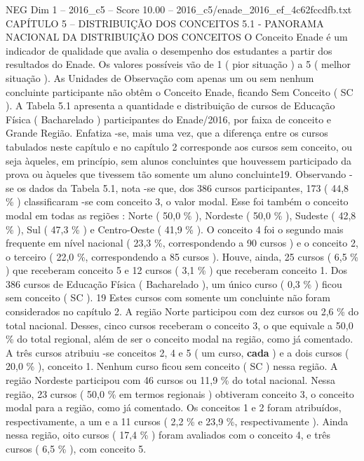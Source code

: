 \begin{textsample}{NEG Dim 1 – 2016\_c5 – Score 10.00 – 2016\_c5/enade\_2016\_ef\_4c62fccdfb.txt}  \label{ex:f1_neg_369}
CAPÍTULO 5 – DISTRIBUIÇÃO DOS CONCEITOS 5.1 - PANORAMA NACIONAL DA DISTRIBUIÇÃO DOS CONCEITOS O Conceito Enade é um indicador de qualidade que avalia o desempenho dos estudantes a partir dos resultados do Enade.
Os valores possíveis vão de 1 ( pior situação ) a 5 ( melhor situação ).
As Unidades de Observação com apenas um ou sem nenhum concluinte participante não obtêm o Conceito Enade, ficando Sem Conceito ( SC ).
A Tabela 5.1 apresenta a quantidade e distribuição de cursos de Educação Física ( Bacharelado ) participantes do Enade/2016, por faixa de conceito e Grande Região.
Enfatiza -se, mais uma vez, que a diferença entre os cursos tabulados neste capítulo e no capítulo 2 corresponde aos cursos sem conceito, ou seja àqueles, em princípio, sem alunos concluintes que houvessem participado da prova ou àqueles que tivessem tão somente um aluno concluinte19.
Observando -se os dados da Tabela 5.1, nota -se que, dos 386 cursos participantes, 173 ( 44,8 \% ) classificaram -se com conceito 3, o valor modal.
Esse foi também o conceito modal em todas as regiões : Norte ( 50,0 \% ), Nordeste ( 50,0 \% ), Sudeste ( 42,8 \% ), Sul ( 47,3 \% ) e Centro-Oeste ( 41,9 \% ).
O conceito 4 foi o segundo mais frequente em nível nacional ( 23,3 \%, correspondendo a 90 cursos ) e o conceito 2, o terceiro ( 22,0 \%, correspondendo a 85 cursos ).
Houve, ainda, 25 cursos ( 6,5 \% ) que receberam conceito 5 e 12 cursos ( 3,1 \% ) que receberam conceito 1.
Dos 386 cursos de Educação Física ( Bacharelado ), um único curso ( 0,3 \% ) ficou sem conceito ( SC ). 19 Estes cursos com somente um concluinte não foram considerados no capítulo 2.
A região Norte participou com dez cursos ou 2,6 \% do total nacional.
Desses, cinco cursos receberam o conceito 3, o que equivale a 50,0 \% do total regional, além de ser o conceito modal na região, como já comentado.
A três cursos atribuiu -se conceitos 2, 4 e 5 ( um curso, \textbf{cada} ) e a dois cursos ( 20,0 \% ), conceito 1.
Nenhum curso ficou sem conceito ( SC ) nessa região.
A região Nordeste participou com 46 cursos ou 11,9 \% do total nacional.
Nessa região, 23 cursos ( 50,0 \% em termos regionais ) obtiveram conceito 3, o conceito modal para a região, como já comentado.
Os conceitos 1 e 2 foram atribuídos, respectivamente, a um e a 11 cursos ( 2,2 \% e 23,9 \%, respectivamente ).
Ainda nessa região, oito cursos ( 17,4 \% ) foram avaliados com o conceito 4, e três cursos ( 6,5 \% ), com conceito 5.

\end{textsample}

